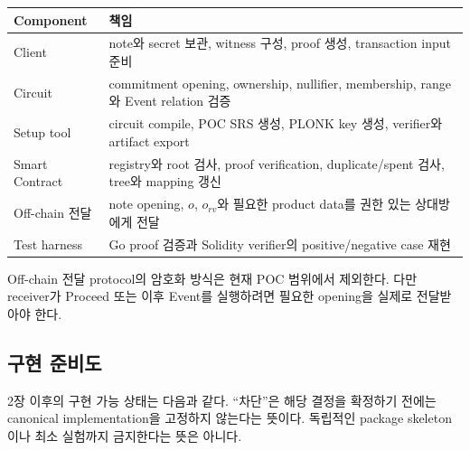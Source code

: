 \documentclass[11pt,a4paper]{extarticle}
\begin{document}
\begin{longtable}{@{}p{}p{}@{}}
\toprule
Component & 책임 \\
\midrule
\endhead
Client & note와 secret 보관, witness 구성, proof 생성, transaction input 준비 \\
Circuit & commitment opening, ownership, nullifier, membership, range와 Event relation 검증 \\
Setup tool & circuit compile, POC SRS 생성, PLONK key 생성, verifier와 artifact export \\
Smart Contract & registry와 root 검사, proof verification, duplicate/spent 검사, tree와 mapping 갱신 \\
Off-chain 전달 & note opening, $o$, $o_{rv}$와 필요한 product data를 권한 있는 상대방에게 전달 \\
Test harness & Go proof 검증과 Solidity verifier의 positive/negative case 재현 \\
\bottomrule
\end{longtable}

Off-chain 전달 protocol의 암호화 방식은 현재 POC 범위에서 제외한다. 다만 receiver가
Proceed 또는 이후 Event를 실행하려면 필요한 opening을 실제로 전달받아야 한다.

\subsection{구현 준비도}

2장 이후의 구현 가능 상태는 다음과 같다. ``차단''은 해당 결정을 확정하기 전에는
canonical implementation을 고정하지 않는다는 뜻이다. 독립적인 package skeleton이나
최소 실험까지 금지한다는 뜻은 아니다.
\end{document}
